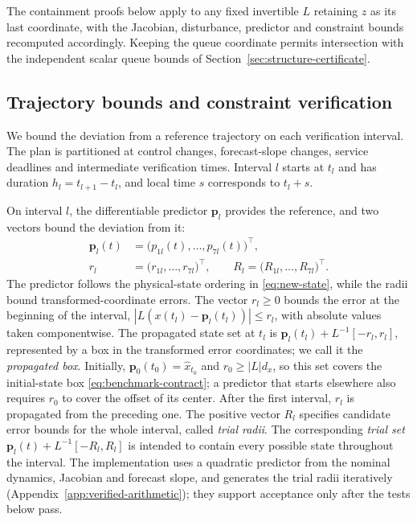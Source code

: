 \documentclass[final]{cas-sc}
\theoremstyle{definition}
\theoremstyle{plain}
\theoremstyle{definition}
\theoremstyle{plain}
\newcommand{\appref}[1]{Appendix~\ref{#1}}
\begin{document}
The containment proofs below apply to any fixed invertible $L$
retaining $z$ as its last coordinate, with the Jacobian, disturbance,
predictor and constraint bounds recomputed accordingly. Keeping the
queue coordinate permits intersection with the independent scalar queue
bounds of Section~\ref{sec:structure-certificate}.

\subsection{Trajectory bounds and constraint verification}
\label{app:new-enclosure-proof}

We bound the deviation from a reference trajectory on each verification
interval. The plan is partitioned at control changes, forecast-slope
changes, service deadlines and intermediate verification times.
Interval $l$ starts at $t_l$ and has duration $h_l=t_{l+1}-t_l$, and
local time $s$ corresponds to $t_l+s$.

On interval $l$, the differentiable predictor $\mathbf p_l$ provides
the reference, and two vectors bound the deviation from it:
\[
\begin{aligned}
\mathbf p_l(t)&=\big(p_{1l}(t),\ldots,p_{7l}(t)\big)^\top ,\\
r_l&=\big(r_{1l},\ldots,r_{7l}\big)^\top ,\qquad
R_l=\big(R_{1l},\ldots,R_{7l}\big)^\top .
\end{aligned}
\]
The predictor follows the physical-state ordering in
\eqref{eq:new-state}, while the radii bound
transformed-coordinate errors. The vector $r_l\ge0$ bounds the error at
the beginning of the interval,
$|L(x(t_l)-\mathbf p_l(t_l))|\le r_l$, with absolute values taken
componentwise. The propagated state set at $t_l$ is
$\mathbf p_l(t_l)+L^{-1}[-r_l,r_l]$, represented by a box in the
transformed error coordinates; we call it the \emph{propagated box}.
Initially, $\mathbf p_0(t_0)=\widehat x_{t_0}$ and $r_0\ge|L|d_x$, so
this set covers the initial-state box
\eqref{eq:benchmark-contract}; a predictor that starts elsewhere also
requires $r_0$ to cover the offset of its center. After the first
interval, $r_l$ is propagated from the preceding one. The positive vector $R_l$ specifies candidate error
bounds for the whole interval, called \emph{trial radii}. The
corresponding \emph{trial set}
$\mathbf p_l(t)+L^{-1}[-R_l,R_l]$ is intended to contain every possible
state throughout the interval. The implementation uses a quadratic
predictor from the nominal dynamics, Jacobian and forecast slope, and
generates the trial radii iteratively
(\appref{app:verified-arithmetic}); they support acceptance only after
the tests below pass.
\end{document}

